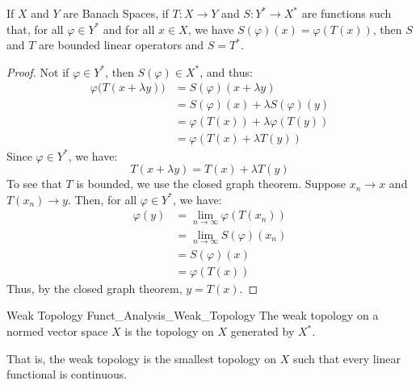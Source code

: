     \begin{theorem}
        If $X$ and $Y$ are Banach Spaces, if $T:X\rightarrow{Y}$
        and $S:Y^{*}\rightarrow{X}^{*}$ are functions such
        that, for all $\varphi\in{Y}^{*}$ and for all $x\in{X}$,
        we have $S(\varphi)(x)=\varphi(T(x))$, then $S$ and $T$
        are bounded linear operators and $S=T^{*}$.
    \end{theorem}
    \begin{proof}
        Not if $\varphi\in{Y}^{*}$, then $S(\varphi)\in{X}^{*}$,
        and thus:
        \begin{subequations}
            \begin{align}
                \varphi\big(T(x+\lambda{y})\big)&=
                S(\varphi)(x+\lambda{y})\\
                &=S(\varphi)(x)+\lambda{S}(\varphi)(y)\\
                &=\varphi(T(x))+\lambda\varphi(T(y))\\
                &=\varphi(T(x)+\lambda{T}(y))
            \end{align}
        \end{subequations}
        Since $\varphi\in{Y}^{*}$, we have:
        \begin{equation}
            T(x+\lambda{y})=T(x)+\lambda{T}(y)
        \end{equation}
        To see that $T$ is bounded, we use the closed graph
        theorem. Suppose $x_{n}\rightarrow{x}$ and
        $T(x_{n})\rightarrow{y}$. Then, for all
        $\varphi\in{Y}^{*}$, we have:
        \begin{subequations}
            \begin{align}
                \varphi(y)&=\underset{n\rightarrow\infty}{\lim}
                    \varphi(T(x_{n}))\\
                    &=\underset{n\rightarrow\infty}{\lim}
                    S(\varphi)(x_{n})\\
                    &=S(\varphi)(x)\\
                    &=\varphi(T(x))
            \end{align}
        \end{subequations}
        Thus, by the closed graph theorem, $y=T(x)$.
    \end{proof}
        \begin{ldefinition}{Weak Topology}
              {Funct_Analysis_Weak_Topology}
            The weak topology on a normed vector space
            $X$ is the topology on $X$ generated by
            $X^{*}$.
        \end{ldefinition}
        That is, the weak topology is the smallest topology on
        $X$ such that every linear functional is continuous.
